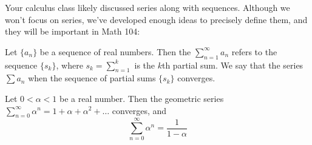 \documentclass[../notes.tex]{subfiles}
\begin{document}
Your calculus class likely discussed series along with sequences. Although we won't focus on series, we've developed enough ideas to precisely define them, and they will be important in Math 104:

\begin{definition}
    Let $\{a_n\}$ be a sequence of real numbers. Then the  $\sum_{n=1}^\infty a_n$ refers to the sequence $\{s_k\}$, where $s_k=\sum_{n=1}^k$ is the $k$th partial sum. We say that the series $\sum a_n$  when the sequence of partial sums $\{s_k\}$ converges. 
\end{definition}

\begin{proposition}
    Let $0 < \alpha  < 1$ be a real number. Then the geometric series $\sum_{n=0}^\infty \alpha^n = 1+\alpha+\alpha^2+\dots $ converges, and 
    \[ \sum_{n=0}^\infty \alpha^n = \frac{1}{1-\alpha}\]
\end{proposition}
\end{document}
